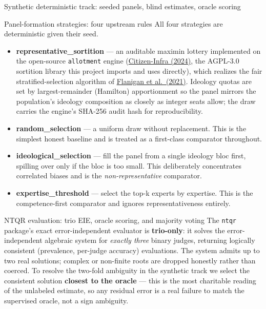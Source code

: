 \documentclass[
  ignorenonframetext,
]{beamer}
\providecommand{\tightlist}{%
  \setlength{\itemsep}{0pt}\setlength{\parskip}{0pt}}
\begin{document}
\begin{frame}{Synthetic deterministic track:
seeded panels, blind estimates, oracle scoring}
\begin{block}{Panel-formation strategies: four upstream rules}
\protect{}\label{panel-formation-strategies-four-upstream-rules}
All four strategies are deterministic given their seed.

\begin{itemize}
\tightlist
\item
  \textbf{representative\_sortition} --- an auditable maximin lottery
  implemented on the open-source \texttt{allotment} engine
  (\href{https://github.com/Citizen-Infra/allotment}{Citizen-Infra
  (2024)}, the AGPL-3.0 sortition library this project imports and uses
  directly), which realizes the fair stratified-selection algorithm of
  \href{https://doi.org/10.1038/s41586-021-03788-6}{Flanigan et
  al.~(2021)}. Ideology quotas are set by largest-remainder (Hamilton)
  apportionment so the panel mirrors the population's ideology
  composition as closely as integer seats allow; the draw carries the
  engine's SHA-256 audit hash for reproducibility.
\item
  \textbf{random\_selection} --- a uniform draw without replacement.
  This is the simplest honest baseline and is treated as a first-class
  comparator throughout.
\item
  \textbf{ideological\_selection} --- fill the panel from a single
  ideology bloc first, spilling over only if the bloc is too small. This
  deliberately concentrates correlated biases and is the
  \emph{non-representative} comparator.
\item
  \textbf{expertise\_threshold} --- select the top-k experts by
  expertise. This is the competence-first comparator and ignores
  representativeness entirely.
\end{itemize}
\end{block}

\begin{block}{NTQR evaluation: trio EIE, oracle scoring, and majority
voting}
\protect{}\label{ntqr-evaluation-trio-eie-oracle-scoring-and-majority-voting}
The \texttt{ntqr} package's exact error-independent evaluator is
\textbf{trio-only}: it solves the error-independent algebraic system for
\emph{exactly three} binary judges, returning logically consistent
(prevalence, per-judge accuracy) evaluations. The system admits up to
two real solutions; complex or non-finite roots are dropped honestly
rather than coerced. To resolve the two-fold ambiguity in the synthetic
track we select the consistent solution \textbf{closest to the oracle}
--- this is the most charitable reading of the unlabeled estimate, so
any residual error is a real failure to match the supervised oracle, not
a sign ambiguity.


\end{block}
\end{frame}
\end{document}
